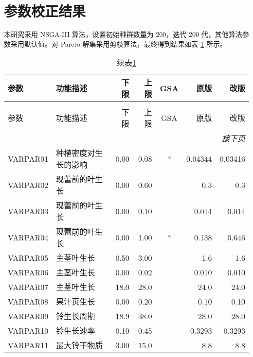 \section{参数校正结果}
本研究采用 NSGA-III 算法，设置初始种群数量为 200，迭代 200 代，其他算法参数采用默认值。对 Pareto 解集采用剪枝算法，最终得到结果如表 \ref{tab:parameters} 所示。
\begin{longtable}{llrrcrr}
    \caption{Cotton2K 参数列表及率定值}\label{tab:parameters}                         \\
    \toprule
    参数     & 功能描述                   & 下限   & 上限   & GSA & 原版    & 改版    \\
    \midrule\endfirsthead
    \caption*{续表\ref{tab:parameters}}                                               \\
    \toprule
    参数     & 功能描述                   & 下限   & 上限   & GSA & 原版    & 改版    \\
    \midrule
    \endhead
    \bottomrule
    \multicolumn{7}{r}{\textit{接下页}}                                               \\
    \endfoot
    \bottomrule
    \endlastfoot
    VARPAR01 & 种植密度对生长的影响       & 0.00   & 0.08   & *   & 0.04344 & 0.03416 \\
    VARPAR02 & 现蕾前的叶生长             & 0.00   & 0.60   &     & 0.3     & 0.3     \\
    VARPAR03 & 现蕾前的叶生长             & 0.00   & 0.10   &     & 0.014   & 0.014   \\
    VARPAR04 & 现蕾前的叶生长             & 0.00   & 1.00   & *   & 0.138   & 0.646   \\
    VARPAR05 & 主茎叶生长                 & 0.50   & 3.00   &     & 1.6     & 1.6     \\
    VARPAR06 & 主茎叶生长                 & 0.00   & 0.02   &     & 0.010   & 0.010   \\
    VARPAR07 & 主茎叶生长                 & 18.0   & 28.0   &     & 24.0    & 24.0    \\
    VARPAR08 & 果汁页生长                 & 0.00   & 0.20   &     & 0.10    & 0.10    \\
    VARPAR09 & 铃生长周期                 & 18.9   & 38.0   &     & 28.0    & 28.0    \\
    VARPAR10 & 铃生长速率                 & 0.10   & 0.45   &     & 0.3293  & 0.3293  \\
    VARPAR11 & 最大铃干物质               & 3.00   & 15.0   &     & 8.8     & 8.8     \\

\end{longtable}
